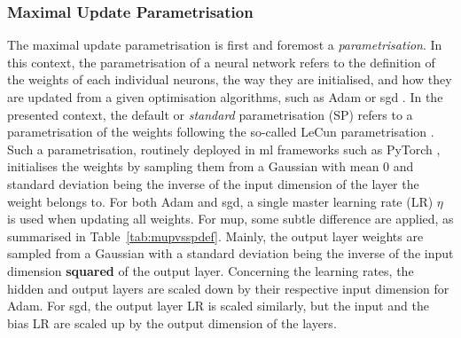 \subsubsection{Maximal Update Parametrisation}
The maximal update parametrisation is first and foremost a \textit{parametrisation}. In this context, the parametrisation of a neural network refers to the definition of the weights of each individual neurons, the way they are initialised, and how they are updated from a given optimisation algorithms, such as Adam or \gls{sgd} \cite{adamPaper}. In the presented context, the default or \textit{standard} parametrisation (SP) refers to a parametrisation of the weights following the so-called LeCun parametrisation \cite{LeCun2012}. Such a parametrisation, routinely deployed in \gls{ml} frameworks such as PyTorch \cite{pytorch}, initialises the weights by sampling them from a Gaussian with mean 0 and standard deviation being the inverse of the input dimension of the layer the weight belongs to. For both Adam and \gls{sgd}, a single master learning rate (LR) $\eta$ is used when updating all weights. For \gls{mup}, some subtle difference are applied, as summarised in Table~\ref{tab:mupvsspdef}. Mainly, the output layer weights are sampled from a Gaussian with a standard deviation being the inverse of the input dimension \textbf{squared} of the output layer. Concerning the learning rates, the hidden and output layers are scaled down by their respective input dimension for Adam. For \gls{sgd}, the output layer LR is scaled similarly, but the input and the bias LR are scaled up by the output dimension of the layers. 

